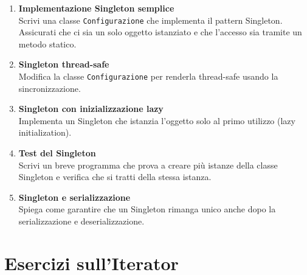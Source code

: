 \documentclass{article}
\begin{document}
\begin{enumerate}
    \item \textbf{Implementazione Singleton semplice} \\
    Scrivi una classe \texttt{Configurazione} che implementa il pattern Singleton. Assicurati che ci sia un solo oggetto istanziato e che l'accesso sia tramite un metodo statico.

    \item \textbf{Singleton thread-safe} \\
    Modifica la classe \texttt{Configurazione} per renderla thread-safe usando la sincronizzazione.

    \item \textbf{Singleton con inizializzazione lazy} \\
    Implementa un Singleton che istanzia l'oggetto solo al primo utilizzo (lazy initialization).

    \item \textbf{Test del Singleton} \\
    Scrivi un breve programma che prova a creare più istanze della classe Singleton e verifica che si tratti della stessa istanza.

    \item \textbf{Singleton e serializzazione} \\
    Spiega come garantire che un Singleton rimanga unico anche dopo la serializzazione e deserializzazione.
\end{enumerate}

\section{Esercizi sull'Iterator}
\end{document}

